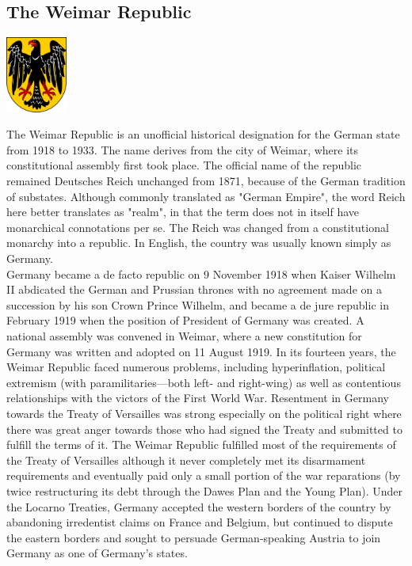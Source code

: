 \documentclass[11pt]{report}
\begin{document}
\subsection{The Weimar Republic}
\vspace{2mm}\begin{center}\includegraphics[width=2cm]{./img/weimarRepublic.jpg}\end{center}
The Weimar Republic is an unofficial historical designation for the German state from 1918 to 1933. The name derives from the city of Weimar, where its constitutional assembly first took place. The official name of the republic remained Deutsches Reich unchanged from 1871, because of the German tradition of substates. Although commonly translated as "German Empire", the word Reich here better translates as "realm", in that the term does not in itself have monarchical connotations per se. The Reich was changed from a constitutional monarchy into a republic. In English, the country was usually known simply as Germany.\\ \indent Germany became a de facto republic on 9 November 1918 when Kaiser Wilhelm II abdicated the German and Prussian thrones with no agreement made on a succession by his son Crown Prince Wilhelm, and became a de jure republic in February 1919 when the position of President of Germany was created. A national assembly was convened in Weimar, where a new constitution for Germany was written and adopted on 11 August 1919. In its fourteen years, the Weimar Republic faced numerous problems, including hyperinflation, political extremism (with paramilitaries—both left- and right-wing) as well as contentious relationships with the victors of the First World War. Resentment in Germany towards the Treaty of Versailles was strong especially on the political right where there was great anger towards those who had signed the Treaty and submitted to fulfill the terms of it. The Weimar Republic fulfilled most of the requirements of the Treaty of Versailles although it never completely met its disarmament requirements and eventually paid only a small portion of the war reparations (by twice restructuring its debt through the Dawes Plan and the Young Plan). Under the Locarno Treaties, Germany accepted the western borders of the country by abandoning irredentist claims on France and Belgium, but continued to dispute the eastern borders and sought to persuade German-speaking Austria to join Germany as one of Germany's states.
\end{document}
